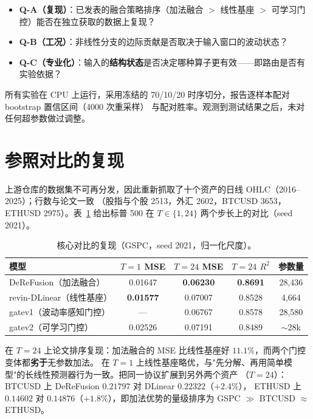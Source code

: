 \documentclass[preprint,12pt]{elsarticle}
\begin{document}
\begin{itemize}
\item \textbf{Q-A（复现）}：已发表的融合策略排序（加法融合 $>$ 线性基座 $>$ 可学习门控）能否在独立获取的数据上复现？
\item \textbf{Q-B（工况）}：非线性分支的边际贡献是否取决于输入窗口的波动状态？
\item \textbf{Q-C（专业化）}：输入的\textbf{结构状态}是否决定哪种算子更有效——即路由是否有实验依据？
\end{itemize}

所有实验在 CPU 上运行，采用冻结的 70/10/20 时序切分，报告逐样本配对 bootstrap 置信区间（4000 次重采样）
与配对胜率。观测到测试结果之后，未对任何超参数做过调整。

\section{参照对比的复现}
\label{sec:repro}

上游仓库的数据集不可再分发，因此重新抓取了十个资产的日线 OHLC（2016--2025）；行数与论文一致
（股指与个股 2513，外汇 2602，BTCUSD 3653，ETHUSD 2975）。表~\ref{tab:repro} 给出标普 500 在
$T\in\{1,24\}$ 两个步长上的对比（seed 2021）。

\begin{table}[!t]
\centering
\small
\caption{核心对比的复现（GSPC，seed 2021，归一化尺度）。}
\label{tab:repro}
\begin{tabular}{@{}lcccc@{}}
\toprule
模型 & $T{=}1$ MSE & $T{=}24$ MSE & $T{=}24$ $R^2$ & 参数量 \\
\midrule
DeReFusion（加法融合）      & 0.01647 & \textbf{0.06230} & \textbf{0.8691} & 28{,}436 \\
revin-DLinear（线性基座）   & \textbf{0.01577} & 0.07007 & 0.8528 & 4{,}664 \\
gatev1（波动率感知门控）    & ---     & 0.06767 & 0.8578 & 28{,}580 \\
gatev2（可学习门控）        & 0.02526 & 0.07191 & 0.8489 & $\sim$28k \\
\bottomrule
\end{tabular}
\end{table}

在 $T=24$ 上论文排序复现：加法融合的 MSE 比线性基座好 $11.1\%$，而两个门控变体都\textbf{劣于}无参数加法。
在 $T=1$ 上线性基座略优，与"先分解、再用简单模型"的长线性预测器行为一致。把同一协议扩展到另外两个资产
（$T=24$）：BTCUSD 上 DeReFusion $0.21797$ 对 DLinear $0.22322$（$+2.4\%$），
ETHUSD 上 $0.14602$ 对 $0.14876$（$+1.8\%$），即加法优势的量级排序为
GSPC $\gg$ BTCUSD $\approx$ ETHUSD。
\end{document}
